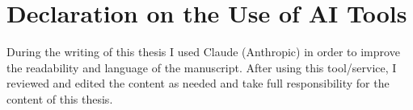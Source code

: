 \chapter*{Declaration on the Use of AI Tools}
During the writing of this thesis I used Claude (Anthropic) in order to improve the readability and language of the manuscript. After using this tool/service, I reviewed and edited the content as needed and take full responsibility for the content of this thesis.

